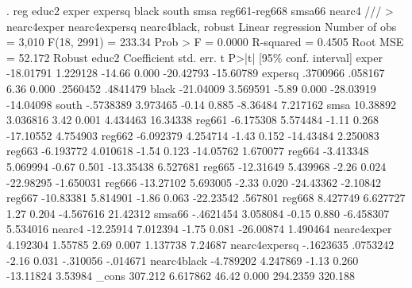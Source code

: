 . reg educ2 exper expersq black south smsa reg661-reg668 smsa66 nearc4 ///
> nearc4exper nearc4expersq nearc4black, robust
{\smallskip}
Linear regression                               Number of obs     =      3,010
                                                F(18, 2991)       =     233.34
                                                Prob > F          =     0.0000
                                                R-squared         =     0.4505
                                                Root MSE          =     52.172
{\smallskip}
              {\VBAR}               Robust
        educ2 {\VBAR} Coefficient  std. err.      t    P>|t|     [95\% conf. interval]
        exper {\VBAR}  -18.01791   1.229128   -14.66   0.000    -20.42793   -15.60789
      expersq {\VBAR}   .3700966    .058167     6.36   0.000     .2560452    .4841479
        black {\VBAR}  -21.04009   3.569591    -5.89   0.000    -28.03919   -14.04098
        south {\VBAR}  -.5738389   3.973465    -0.14   0.885     -8.36484    7.217162
         smsa {\VBAR}   10.38892   3.036816     3.42   0.001     4.434463    16.34338
       reg661 {\VBAR}  -6.175308   5.574484    -1.11   0.268    -17.10552    4.754903
       reg662 {\VBAR}  -6.092379   4.254714    -1.43   0.152    -14.43484    2.250083
       reg663 {\VBAR}  -6.193772   4.010618    -1.54   0.123    -14.05762    1.670077
       reg664 {\VBAR}  -3.413348   5.069994    -0.67   0.501    -13.35438    6.527681
       reg665 {\VBAR}  -12.31649   5.439968    -2.26   0.024    -22.98295   -1.650031
       reg666 {\VBAR}  -13.27102   5.693005    -2.33   0.020    -24.43362    -2.10842
       reg667 {\VBAR}  -10.83381   5.814901    -1.86   0.063    -22.23542     .567801
       reg668 {\VBAR}   8.427749   6.627727     1.27   0.204    -4.567616    21.42312
       smsa66 {\VBAR}  -.4621454   3.058084    -0.15   0.880    -6.458307    5.534016
       nearc4 {\VBAR}  -12.25914   7.012394    -1.75   0.081    -26.00874    1.490464
  nearc4exper {\VBAR}   4.192304    1.55785     2.69   0.007     1.137738     7.24687
nearc4expersq {\VBAR}  -.1623635   .0753242    -2.16   0.031     -.310056    -.014671
  nearc4black {\VBAR}  -4.789202   4.247869    -1.13   0.260    -13.11824     3.53984
        _cons {\VBAR}    307.212   6.617862    46.42   0.000     294.2359     320.188
{\smallskip}
